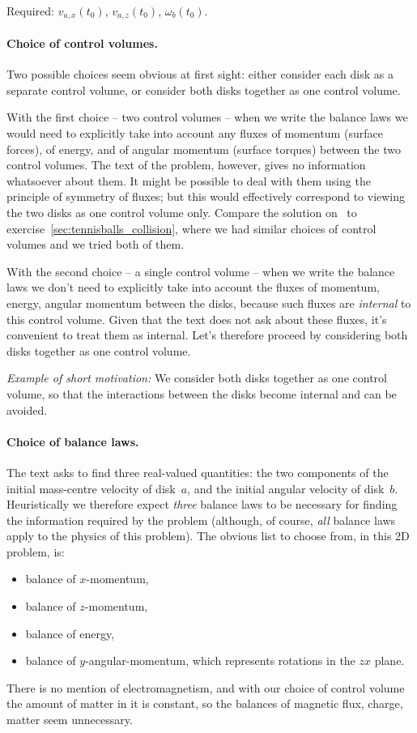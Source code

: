 \documentclass[a4paper,12pt,%
onecolumn,oneside,%
british%
]{memoir}
\renewcommand*{\|}[1][]{\nonscript\:#1\vert\nonscript\:\mathopen{}}
\newcommand*{\yti}{t_{0}}
\begin{document}
Required: $v_{a,x}(\yti)$, $v_{a,z}(\yti)$, $\omega_{b}(\yti)$.


\paragraph{Choice of control volumes.}

Two possible choices seem obvious at first sight: either consider each disk as a separate control volume, or consider both disks together as one control volume.

With the first choice -- two control volumes -- when we write the balance laws we would need to explicitly take into account any fluxes of momentum (surface forces), of energy, and of angular momentum (surface torques) between the two control volumes. The text of the problem, however, gives no information whatsoever about them. It might be possible to deal with them using the principle of symmetry of fluxes; but this would effectively correspond to viewing the two disks as one control volume only. Compare the solution on~\pageref{sec:tennisballs_collision_sol} to exercise~\ref{sec:tennisballs_collision}, where we had similar choices of control volumes and we tried both of them.

With the second choice -- a single control volume -- when we write the balance laws we don't need to explicitly take into account the fluxes of momentum, energy, angular momentum between the disks, because such fluxes are \emph{internal} to this control volume. Given that the text does not ask about these fluxes, it's convenient to treat them as internal. Let's therefore proceed by considering both disks together as one control volume.

\medskip

\emph{Example of short motivation:} We consider both disks together as one control volume, so that the interactions between the disks become internal and can be avoided.

\paragraph{Choice of balance laws.} The text asks to find three real-valued quantities: the two components of the initial mass-centre velocity of disk~$a$, and the initial angular velocity of disk~$b$. Heuristically we therefore expect \emph{three} balance laws to be necessary for finding the information required by the problem (although, of course, \emph{all} balance laws apply to the physics of this problem). The obvious list to choose from, in this 2D problem, is:
\begin{itemize}[nosep]
\item balance of $x$-momentum,
\item balance of $z$-momentum,
\item balance of energy,
\item balance of $y$-angular-momentum, which represents rotations in the $zx$ plane.
\end{itemize}
There is no mention of electromagnetism, and with our choice of control volume the amount of matter in it is constant, so the balances of magnetic flux, charge, matter seem unnecessary.
\end{document}
